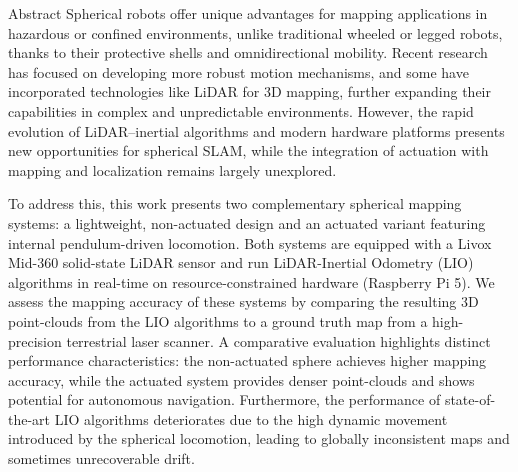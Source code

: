 \documentclass[english, bachelor, utf8]{base/thesis_telematics}
\begin{document}
\begin{prefacesection}{Abstract}
Spherical robots offer unique advantages for mapping applications in hazardous or confined environments, unlike traditional wheeled or legged robots, thanks to their protective shells and omnidirectional mobility. 
Recent research has focused on developing more robust motion mechanisms, and some have incorporated technologies like LiDAR for 3D mapping, further expanding their capabilities in complex and unpredictable environments. 
However, the rapid evolution of LiDAR–inertial algorithms and modern hardware platforms presents new opportunities for spherical SLAM, while the integration of actuation with mapping and localization remains largely unexplored.

To address this, this work presents two complementary spherical mapping systems: a light\-weight, non-actuated design and an actuated variant featuring internal pendulum-driven locomotion. 
Both systems are equipped with a Livox Mid-360 solid-state LiDAR sensor and run LiDAR-Inertial Odometry (LIO) algorithms in real-time on resource-constrained hardware (Raspberry Pi 5). 
We assess the mapping accuracy of these systems by comparing the resulting 3D point-clouds from the LIO algorithms to a ground truth map from a high-precision terrestrial laser scanner.
A comparative evaluation highlights distinct performance characteristics: the non-actuated sphere achieves higher mapping accuracy, while the actuated system provides denser point-clouds and shows potential for autonomous navigation. 
Furthermore, the performance of state-of-the-art LIO algorithms deteriorates due to the high dynamic movement introduced by the spherical locomotion, leading to globally inconsistent maps and sometimes unrecoverable drift.
\end{prefacesection}
\cleardoublepage
\tableofcontents

\thispagestyle{empty}
\listoffigures
\listoftables
\newpage
{}

\startTextChapters %
\end{document}
